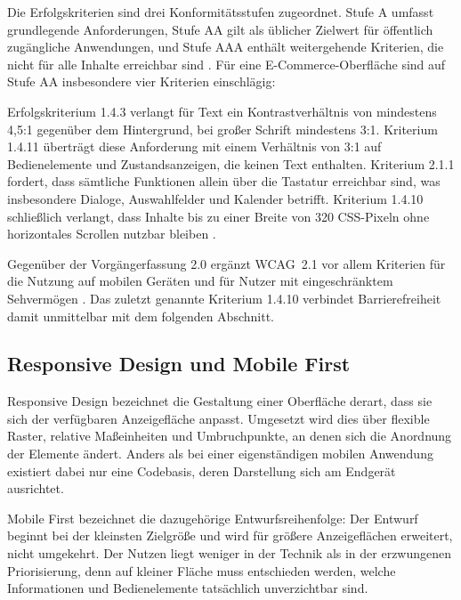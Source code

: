 Die Erfolgskriterien sind drei Konformitätsstufen zugeordnet.
Stufe A umfasst grundlegende Anforderungen, Stufe AA gilt als
üblicher Zielwert für öffentlich zugängliche Anwendungen, und
Stufe AAA enthält weitergehende Kriterien, die nicht für alle
Inhalte erreichbar sind \cite{wcag21}. Für eine
E-Commerce-Oberfläche sind auf Stufe AA insbesondere vier
Kriterien einschlägig:
 
Erfolgskriterium 1.4.3 verlangt für Text ein Kontrastverhältnis
von mindestens 4,5:1 gegenüber dem Hintergrund, bei großer Schrift
mindestens 3:1. Kriterium 1.4.11 überträgt diese Anforderung mit
einem Verhältnis von 3:1 auf Bedienelemente und
Zustandsanzeigen, die keinen Text enthalten. Kriterium 2.1.1
fordert, dass sämtliche Funktionen allein über die Tastatur
erreichbar sind, was insbesondere Dialoge, Auswahlfelder und
Kalender betrifft. Kriterium 1.4.10 schließlich verlangt, dass
Inhalte bis zu einer Breite von 320 \acs{CSS}-Pixeln ohne
horizontales Scrollen nutzbar bleiben \cite{wcag21}.
 
Gegenüber der Vorgängerfassung 2.0 ergänzt \acs{WCAG}~2.1 vor allem
Kriterien für die Nutzung auf mobilen Geräten und für Nutzer mit
eingeschränktem Sehvermögen \cite{shah_design_system_2023}. Das
zuletzt genannte Kriterium 1.4.10 verbindet Barrierefreiheit damit
unmittelbar mit dem folgenden Abschnitt.
 
 
\subsection{Responsive Design und Mobile First}
\label{subsec:responsive-design}
 
Responsive Design bezeichnet die Gestaltung einer Oberfläche
derart, dass sie sich der verfügbaren Anzeigefläche anpasst.
Umgesetzt wird dies über flexible Raster, relative Maßeinheiten
und Umbruchpunkte, an denen sich die Anordnung der Elemente
ändert. Anders als bei einer eigenständigen mobilen Anwendung
existiert dabei nur eine Codebasis, deren Darstellung sich am
Endgerät ausrichtet.
 
Mobile First bezeichnet die dazugehörige Entwurfsreihenfolge: Der
Entwurf beginnt bei der kleinsten Zielgröße und wird für größere
Anzeigeflächen erweitert, nicht umgekehrt. Der Nutzen liegt weniger
in der Technik als in der erzwungenen Priorisierung, denn auf
kleiner Fläche muss entschieden werden, welche Informationen und
Bedienelemente tatsächlich unverzichtbar sind.
 
